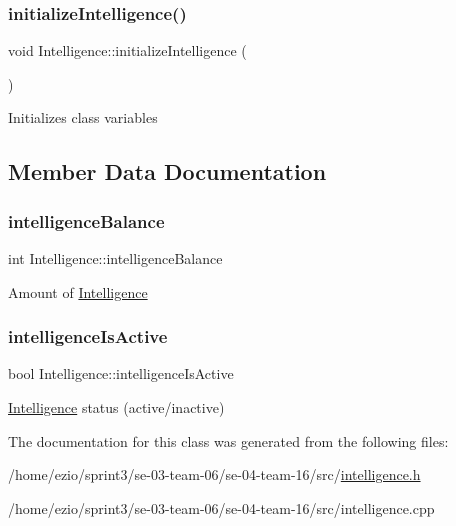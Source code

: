 \subsubsection{\texorpdfstring{initialize\+Intelligence()}{initializeIntelligence()}}
{\footnotesize\ttfamily void Intelligence\+::initialize\+Intelligence (\begin{DoxyParamCaption}{ }\end{DoxyParamCaption})}

Initializes class variables 

\subsection{Member Data Documentation}
\mbox{\label{classIntelligence_a20fc418262dd34db0d9e99d81d6a7544}} 
\subsubsection{\texorpdfstring{intelligence\+Balance}{intelligenceBalance}}
{\footnotesize\ttfamily int Intelligence\+::intelligence\+Balance}

Amount of \hyperlink{classIntelligence}{Intelligence} \mbox{\label{classIntelligence_ad8d4fda31beb86dc434f71fe6c683ae9}} 
\subsubsection{\texorpdfstring{intelligence\+Is\+Active}{intelligenceIsActive}}
{\footnotesize\ttfamily bool Intelligence\+::intelligence\+Is\+Active}

\hyperlink{classIntelligence}{Intelligence} status (active/inactive) 

The documentation for this class was generated from the following files\+:\begin{DoxyCompactItemize}
\item 
/home/ezio/sprint3/se-\/03-\/team-\/06/se-\/04-\/team-\/16/src/\hyperlink{intelligence_8h}{intelligence.\+h}\item 
/home/ezio/sprint3/se-\/03-\/team-\/06/se-\/04-\/team-\/16/src/intelligence.\+cpp\end{DoxyCompactItemize}
